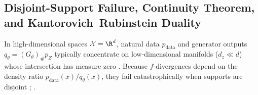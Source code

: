 \documentclass[../../../../master.tex]{subfiles}
\begin{document}
\subsection{Disjoint-Support Failure, Continuity Theorem, and Kantorovich--Rubinstein Duality}

In high-dimensional spaces $\mathcal{X} = \R^d$, natural data $p_{\mathrm{data}}$ and generator outputs $q_\theta = (G_\theta)_\# p_Z$ typically concentrate on low-dimensional manifolds ($d_z \ll d$) whose intersection has measure zero . Because $f$-divergences depend on the density ratio $p_{\mathrm{data}}(x)/q_\theta(x)$, they fail catastrophically when supports are disjoint ; .
\end{document}

